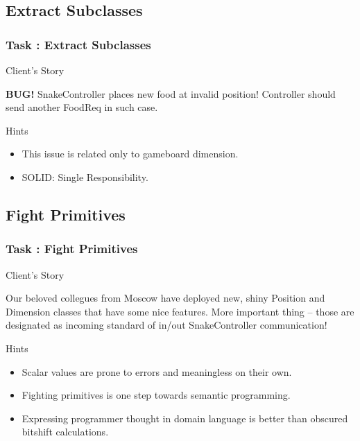 \documentclass[english,handout]{beamer}
\newenvironment{narrowblock}[1]{%
\begin{center}
\begin{minipage}{10.5cm}
\begin{block}{#1}
}{%
\end{block}
\end{minipage}
\end{center}
}
\begin{document}
\subsection{Extract Subclasses}

\begin{frame}
\frametitle{Task \thesubsection: Extract Subclasses}

\begin{narrowblock}{Client's Story}
\textbf{BUG!} SnakeController places new food at invalid position! Controller should send another FoodReq in such case.
\end{narrowblock}

\pause
\begin{narrowblock}{Hints}
\begin{itemize}[<+->]
\item This issue is related only to gameboard dimension.
\item SOLID: Single Responsibility.
\end{itemize}
\end{narrowblock}
\end{frame}

\subsection{Fight Primitives}

\begin{frame}
\frametitle{Task \thesubsection: Fight Primitives}

\begin{narrowblock}{Client's Story}
Our beloved collegues from Moscow have deployed new, shiny Position and Dimension classes that have some nice features. More important thing -- those are designated as incoming standard of in/out SnakeController communication! 
\end{narrowblock}

\pause
\begin{narrowblock}{Hints}
\begin{itemize}[<+->]
\item Scalar values are prone to errors and meaningless on their own. 
\item Fighting primitives is one step towards semantic programming.
\item Expressing programmer thought in domain language is better than obscured bitshift calculations.
\end{itemize}
\end{narrowblock}
\end{frame}
\end{document}
